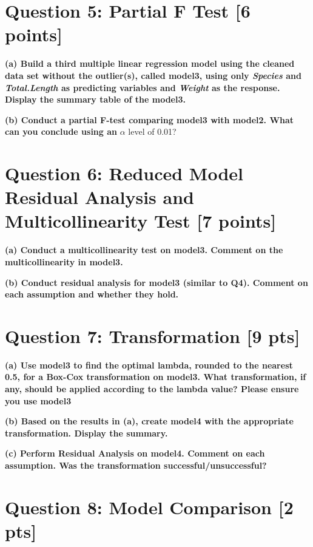 \documentclass[
]{article}
\begin{document}
\hypertarget{question-5-partial-f-test-6-points}{%
\section{Question 5: Partial F Test {[}6
points{]}}\label{question-5-partial-f-test-6-points}}

\textbf{(a) Build a third multiple linear regression model using the
cleaned data set without the outlier(s), called model3, using only
\emph{Species} and \emph{Total.Length} as predicting variables and
\emph{Weight} as the response. Display the summary table of the model3.}

\textbf{(b) Conduct a partial F-test comparing model3 with model2. What
can you conclude using an} \(\alpha\) level of 0.01?

\hypertarget{question-6-reduced-model-residual-analysis-and-multicollinearity-test-7-points}{%
\section{Question 6: Reduced Model Residual Analysis and
Multicollinearity Test {[}7
points{]}}\label{question-6-reduced-model-residual-analysis-and-multicollinearity-test-7-points}}

\textbf{(a) Conduct a multicollinearity test on model3. Comment on the
multicollinearity in model3.}

\textbf{(b) Conduct residual analysis for model3 (similar to Q4).
Comment on each assumption and whether they hold.}

\hypertarget{question-7-transformation-9-pts}{%
\section{Question 7: Transformation {[}9
pts{]}}\label{question-7-transformation-9-pts}}

\textbf{(a) Use model3 to find the optimal lambda, rounded to the
nearest 0.5, for a Box-Cox transformation on model3. What
transformation, if any, should be applied according to the lambda value?
Please ensure you use model3}

\textbf{(b) Based on the results in (a), create model4 with the
appropriate transformation. Display the summary.}

\textbf{(c) Perform Residual Analysis on model4. Comment on each
assumption. Was the transformation successful/unsuccessful?}

\hypertarget{question-8-model-comparison-2-pts}{%
\section{Question 8: Model Comparison {[}2
pts{]}}\label{question-8-model-comparison-2-pts}}
\end{document}
